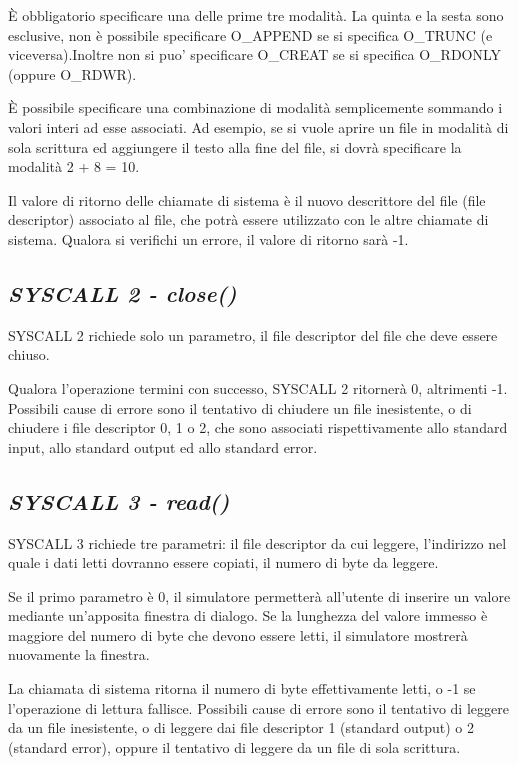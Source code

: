 \documentclass[letterpaper,10pt,italian]{sphinxmanual}
\begin{document}
È obbligatorio specificare una delle prime tre modalità. La quinta e
la sesta sono esclusive, non è possibile specificare O\_APPEND se si
specifica O\_TRUNC (e viceversa).Inoltre non si puo' specificare O\_CREAT se
si specifica O\_RDONLY (oppure O\_RDWR).

È possibile specificare una combinazione di modalità semplicemente
sommando i valori interi ad esse associati.  Ad esempio, se si vuole aprire un
file in modalità di sola scrittura ed aggiungere il testo alla fine del
file, si dovrà specificare la modalità 2 + 8 = 10.

Il valore di ritorno delle chiamate di sistema è il nuovo descrittore del
file (file descriptor) associato al file, che potrà essere utilizzato con
le altre chiamate di sistema. Qualora si verifichi un errore, il valore di
ritorno sarà -1.


\subsection{\emph{SYSCALL 2 - close()}}
\label{instructions:syscall-2-close}
SYSCALL 2 richiede solo un parametro, il file descriptor del file che deve
essere chiuso.

Qualora l'operazione termini con successo, SYSCALL 2 ritornerà 0, altrimenti
-1.  Possibili cause di errore sono il tentativo di chiudere un file
inesistente, o di chiudere i file descriptor 0, 1 o 2, che sono associati
rispettivamente allo standard input, allo standard output ed allo standard
error.


\subsection{\emph{SYSCALL 3 - read()}}
\label{instructions:syscall-3-read}
SYSCALL 3 richiede tre parametri: il file descriptor da cui leggere, l'indirizzo
nel quale i dati letti dovranno essere copiati, il numero di byte da leggere.

Se il primo parametro è 0, il simulatore permetterà all'utente di
inserire un valore mediante un'apposita finestra di dialogo.  Se la lunghezza
del valore immesso è maggiore del numero di byte che devono essere letti,
il simulatore mostrerà nuovamente la finestra.

La chiamata di sistema ritorna il numero di byte effettivamente letti, o -1 se
l'operazione di lettura fallisce. Possibili cause di errore sono il tentativo
di leggere da un file inesistente, o di leggere dai file descriptor 1
(standard output) o 2 (standard error), oppure il tentativo di leggere da un
file di sola scrittura.
\end{document}
